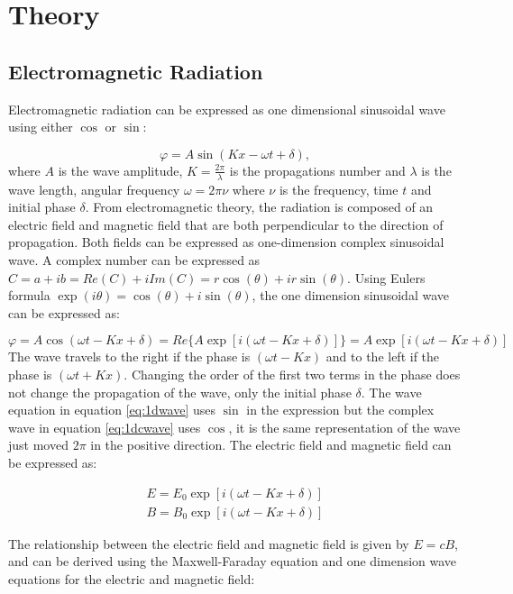\documentclass[MasterThesisMain.tex]{subfiles}
\begin{document}
\chapter{Theory}

\section{Electromagnetic Radiation}
Electromagnetic radiation can be expressed as one dimensional sinusoidal wave using either $\cos$ or $\sin$:

\begin{equation}\label{eq:1dwave}
\varphi = A\sin(Kx-\omega t+\delta),
\end{equation}
where $A$ is the wave amplitude, $K=\frac{2\pi}{\lambda}$ is the propagations number and $\lambda$ is the wave length, angular frequency $\omega = 2\pi\nu$ where $\nu$ is the frequency, time $t$ and initial phase $\delta$.
From electromagnetic theory, the radiation is composed of an electric field and magnetic field that are both perpendicular to the direction of propagation. Both fields can be expressed as one-dimension complex sinusoidal wave. A complex number can be expressed as $C= a + ib =Re(C) + i Im(C) =r\cos(\theta)+ir\sin(\theta)$. Using Eulers formula $\exp(i\theta)=\cos(\theta)+i\sin(\theta)$, the one dimension sinusoidal wave can be expressed as:

\begin{equation}\label{eq:1dcwave}
\varphi=A\cos(\omega t- Kx +\delta) = Re \{A\exp[i(\omega t- Kx +\delta)]\} = A\exp[i(\omega t - Kx + \delta)]
\end{equation}
The wave travels to the right if the phase is $(\omega t - Kx)$ and to the left if the phase is $(\omega t + Kx)$. Changing the order of the first two terms in the phase does not change the propagation of the wave, only the initial phase $\delta$. The wave equation in equation \ref{eq:1dwave} uses $\sin$ in the expression but the complex wave in equation \ref{eq:1dcwave} uses $\cos$, it is the same representation of the wave just moved $2\pi$ in the positive direction. The electric field and magnetic field can be expressed as:

\begin{align}
E=E_0\exp[i(\omega t-Kx+\delta)]\\
B=B_0\exp[i(\omega t-Kx+\delta)]
\end{align}

The relationship between the electric field and magnetic field is given by $E=cB$, and can be derived using the Maxwell-Faraday equation and one dimension wave equations for the electric and magnetic field:
\end{document}
